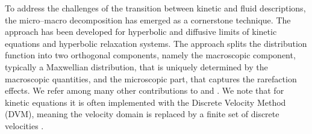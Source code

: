 \documentclass[final,11pt]{siamart251216}
\numberwithin{equation}{section}
\theoremstyle{definition}
\theoremstyle{remark}
\begin{document}
To address the challenges of the transition between kinetic and fluid descriptions, the micro--macro decomposition has emerged as a cornerstone technique. The approach has been developed for hyperbolic and diffusive limits of kinetic  equations and hyperbolic relaxation systems. The  approach splits the distribution function into two orthogonal components, namely the macroscopic component, typically a Maxwellian distribution, that is uniquely determined by the macroscopic quantities, and the microscopic part, that captures the rarefaction effects.
We refer among many other contributions to \cite{JinLevermore1996,JinPareschiToscani1998,KlarAP}
and 
\cite{BennouneLemou,CrouseillesLemou,LemouMieussens,K992,JinPareschiToscani1999,NaldiPareschiToscani2002,Mapundi}. 
We note that for kinetic equations  it is often  implemented with the Discrete Velocity Method (DVM), meaning the velocity domain is replaced by a finite set of discrete velocities \cite{Dimarco_acta,Illner,Mieussens}.
\end{document}
